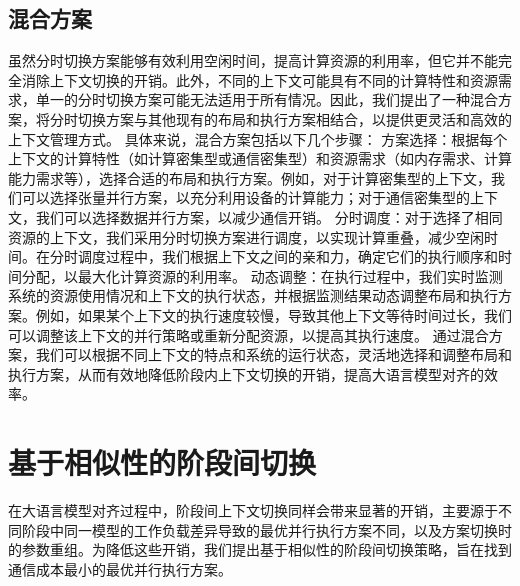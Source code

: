 \subsection{混合方案}
虽然分时切换方案能够有效利用空闲时间，提高计算资源的利用率，但它并不能完全消除上下文切换的开销。此外，不同的上下文可能具有不同的计算特性和资源需求，单一的分时切换方案可能无法适用于所有情况。因此，我们提出了一种混合方案，将分时切换方案与其他现有的布局和执行方案相结合，以提供更灵活和高效的上下文管理方式。
具体来说，混合方案包括以下几个步骤：
方案选择：根据每个上下文的计算特性（如计算密集型或通信密集型）和资源需求（如内存需求、计算能力需求等），选择合适的布局和执行方案。例如，对于计算密集型的上下文，我们可以选择张量并行方案，以充分利用设备的计算能力；对于通信密集型的上下文，我们可以选择数据并行方案，以减少通信开销。
分时调度：对于选择了相同资源的上下文，我们采用分时切换方案进行调度，以实现计算重叠，减少空闲时间。在分时调度过程中，我们根据上下文之间的亲和力，确定它们的执行顺序和时间分配，以最大化计算资源的利用率。
动态调整：在执行过程中，我们实时监测系统的资源使用情况和上下文的执行状态，并根据监测结果动态调整布局和执行方案。例如，如果某个上下文的执行速度较慢，导致其他上下文等待时间过长，我们可以调整该上下文的并行策略或重新分配资源，以提高其执行速度。
通过混合方案，我们可以根据不同上下文的特点和系统的运行状态，灵活地选择和调整布局和执行方案，从而有效地降低阶段内上下文切换的开销，提高大语言模型对齐的效率。
\section{基于相似性的阶段间切换}
在大语言模型对齐过程中，阶段间上下文切换同样会带来显著的开销，主要源于不同阶段中同一模型的工作负载差异导致的最优并行执行方案不同，以及方案切换时的参数重组。为降低这些开销，我们提出基于相似性的阶段间切换策略，旨在找到通信成本最小的最优并行执行方案。
